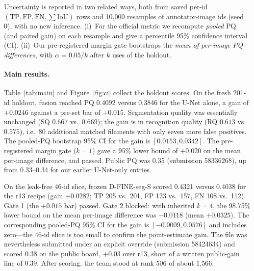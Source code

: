 \documentclass[sigconf,nonacm]{acmart}
\begin{document}
Uncertainty is reported in two related ways, both from saved per-id $(\mathrm{TP},\mathrm{FP},\mathrm{FN},\sum\mathrm{IoU})$ rows and 10{,}000 resamples of annotator-image ids (seed 0), with no new inference. (i)~For the official metric we recompute \emph{pooled} PQ (and paired gain) on each resample and give a percentile 95\% confidence interval (CI). (ii)~Our pre-registered margin gate bootstraps the \emph{mean of per-image PQ differences}, with $\alpha=0.05/k$ after $k$ uses of the holdout.

\paragraph{Main results.}
Table~\ref{tab:main} and Figure~\ref{fig:ci} collect the holdout scores. On the fresh 201-id holdout, fusion reached PQ 0.4092 versus 0.3846 for the U-Net alone, a gain of $+0.0246$ against a pre-set bar of $+0.015$. Segmentation quality was essentially unchanged (SQ $0.667$ vs.\ $0.669$); the gain is in recognition quality (RQ $0.613$ vs.\ $0.575$), i.e.\ 80 additional matched filaments with only seven more false positives. The pooled-PQ bootstrap 95\% CI for the gain is $[0.0153,0.0342]$. The pre-registered margin gate ($k=1$) gave a 95\% lower bound of $+0.020$ on the mean per-image difference, and passed. Public PQ was 0.35 (submission 58336268), up from 0.33--0.34 for our earlier U-Net-only entries.

On the leak-free 46-id slice, frozen D-FINE-seg-S scored 0.4321 versus 0.4038 for the r13 recipe (gain $+0.0282$; TP 205 vs.\ 201, FP 123 vs.\ 157, FN 108 vs.\ 112). Gate 1 (the $+0.015$ bar) passed. Gate 2 blocked: with inherited $k=4$, the 98.75\% lower bound on the mean per-image difference was $-0.0118$ (mean $+0.0325$). The corresponding pooled-PQ 95\% CI for the gain is $[-0.0009,0.0576]$ and includes zero---the 46-id slice is too small to confirm the point-estimate gain. The file was nevertheless submitted under an explicit override (submission 58424634) and scored 0.38 on the public board, $+0.03$ over r13, short of a written public-gain line of 0.39. After scoring, the team stood at rank 506 of about 1{,}566.
\end{document}

